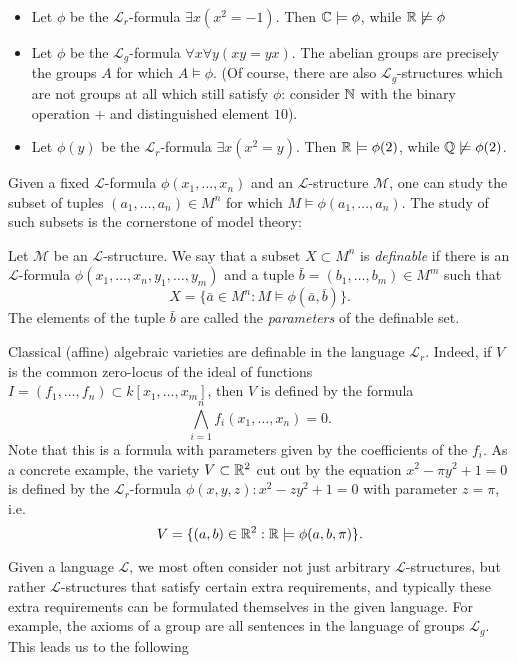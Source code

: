 \begin{example}
	\begin{itemize}
		\item Let $\phi$ be the $\mathcal{L}_r$-formula $\exists x (x^2=-1)$. Then $\mathbb{C}\models \phi$, while $\mathbb{R}\not\models \phi$
		\item Let $\phi$ be the $\mathcal{L}_g$-formula $\forall x\forall y(xy=yx)$. The abelian groups are precisely the groups $A$ for which $A\models \phi$. (Of course, there are also $\mathcal{L}_g$-structures which are not groups at all which still satisfy $\phi$: consider $\mathbb{N}$ with the binary operation $+$ and distinguished element $10$).
		\item Let $\phi(y)$ be the $\mathcal{L}_r$-formula $\exists x(x^2=y)$. Then $\mathbb{R}\models\phi(2)$, while $\mathbb{Q}\not\models\phi(2)$.
	\end{itemize}
\end{example}

Given a fixed $\mathcal{L}$-formula $\phi(x_1,\dots, x_n)$ and an $\mathcal{L}$-structure $\mathcal{M}$, one can study the subset of tuples $(a_1,\dots, a_n)\in M^n$ for which $M\models \phi(a_1,\dots, a_n)$. The study of such subsets is the cornerstone of model theory:

\begin{definition}
Let $\mathcal{M}$ be an $\mathcal{L}$-structure. We say that a subset $X\subset M^n$ is \emph{definable} if there is an $\mathcal{L}$-formula $\phi(x_1,\dots, x_n, y_1,\dots, y_m)$ and a tuple $\bar{b}=(b_1,\dots, b_m)\in M^m$ such that $$X=\{\bar{a}\in M^n: M\models \phi(\bar{a},\bar{b})\}.$$ The elements of the tuple $\bar{b}$ are called the \emph{parameters} of the definable set. 
\end{definition}

\begin{example}
Classical (affine) algebraic varieties are definable in the language $\mathcal{L}_r$. Indeed, if $V$ is the common zero-locus of the ideal of functions $I=(f_1,\dots, f_n)\subset k[x_1,\dots,x_m]$, then $V$ is defined by the formula $$\bigwedge_{i=1}^n f_i(x_1,\dots, x_n)=0.$$ Note that this is a formula with parameters given by the coefficients of the $f_i$. As a concrete example, the variety $V\subset\mathbb{R}^2$ cut out by the equation $x^2-\pi y^2+1=0$ is defined by the $\mathcal{L}_r$-formula $\phi(x,y,z): x^2-zy^2+1=0$ with parameter $z=\pi$, i.e. $$V=\{(a,b)\in\mathbb{R}^2: \mathbb{R}\models\phi(a,b,\pi)\}.$$
\end{example}

Given a language $\mathcal{L}$, we most often consider not just arbitrary $\mathcal{L}$-structures, but rather $\mathcal{L}$-structures that satisfy certain extra requirements, and typically these extra requirements can be formulated themselves in the given language. For example, the axioms of a group are all sentences in the language of groups $\mathcal{L}_g$. This leads us to the following

